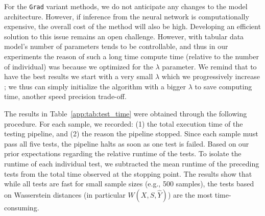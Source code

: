 \documentclass[runningheads, orivec]{llncs}
\begin{document}
For the \texttt{Grad} variant methods, we do not anticipate any changes to the model architecture. However, if inference from the neural network is computationally expensive, the overall cost of the method will also be high. Developing an efficient solution to this issue remains an open challenge. However, with tabular data model's number of parameters tends to be controllable, and thus in our experiments the reason of such a long time compute time (relative to the number of individual) was because we optimized for the $\lambda$ parameter. We remind that to have the best results we start with a very small $\lambda$ which we progressively increase ; we thus can simply initialize the algorithm with a bigger $\lambda$ to save computing time, another speed precision trade-off.

The results in Table~\ref{app:tab:test_time} were obtained through the following procedure. For each sample, we recorded: (1) the total execution time of the testing pipeline, and (2) the reason the pipeline stopped. Since each sample must pass all five tests, the pipeline halts as soon as one test is failed. Based on our prior expectations regarding the relative runtime of the tests. To isolate the runtime of each individual test, we subtracted the mean runtime of the preceding tests from the total time observed at the stopping point.
The results show that while all tests are fast for small sample sizes (e.g., 500 samples), the tests based on Wasserstein distances (in particular $W(X,S,\widehat{Y})$) are the most time-consuming.

\begin{table}[ht!]
  \caption{Memory cost analysis of the methods for a $N \times J$ dataset.}
  \label{app:tab:memory}
  \centering

\end{table}
\end{document}
